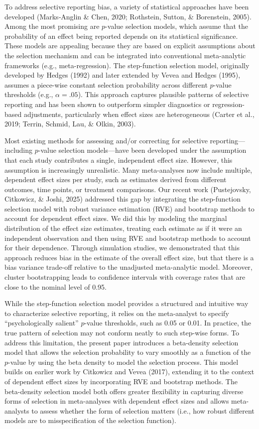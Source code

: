 \documentclass[
  man, donotrepeattitle,floatsintext]{apa7}
\begin{document}
To address selective reporting bias, a variety of statistical approaches have been developed (Marks‐Anglin \& Chen, 2020; Rothstein, Sutton, \& Borenstein, 2005). Among the most promising are \(p\)-value selection models, which assume that the probability of an effect being reported depends on its statistical significance. These models are appealing because they are based on explicit assumptions about the selection mechanism and can be integrated into conventional meta-analytic frameworks (e.g., meta-regression). The step-function selection model, originally developed by Hedges (1992) and later extended by Vevea and Hedges (1995), assumes a piece-wise constant selection probability across different \(p\)-value thresholds (e.g., \(\alpha = .05\)). This approach captures plausible patterns of selective reporting and has been shown to outperform simpler diagnostics or regression-based adjustments, particularly when effect sizes are heterogeneous (Carter et al., 2019; Terrin, Schmid, Lau, \& Olkin, 2003).

Most existing methods for assessing and/or correcting for selective reporting---including \(p\)-value selection models---have been developed under the assumption that each study contributes a single, independent effect size. However, this assumption is increasingly unrealistic. Many meta-analyses now include multiple, dependent effect sizes per study, such as estimates derived from different outcomes, time points, or treatment comparisons. Our recent work (Pustejovsky, Citkowicz, \& Joshi, 2025) addressed this gap by integrating the step-function selection model with robust variance estimation (RVE) and bootstrap methods to account for dependent effect sizes. We did this by modeling the marginal distribution of the effect size estimates, treating each estimate as if it were an independent observation and then using RVE and bootstrap methods to account for their dependence. Through simulation studies, we demonstrated that this approach reduces bias in the estimate of the overall effect size, but that there is a bias variance trade-off relative to the unadjusted meta-analytic model. Moreover, cluster bootstrapping leads to confidence intervals with coverage rates that are close to the nominal level of 0.95.

While the step-function selection model provides a structured and intuitive way to characterize selective reporting, it relies on the meta-analyst to specify ``psychologically salient'' \(p\)-value thresholds, such as 0.05 or 0.01. In practice, the true pattern of selection may not conform neatly to such step-wise forms. To address this limitation, the present paper introduces a beta-density selection model that allows the selection probability to vary smoothly as a function of the \(p\)-value by using the beta density to model the selection process. This model builds on earlier work by Citkowicz and Vevea (2017), extending it to the context of dependent effect sizes by incorporating RVE and bootstrap methods. The beta-density selection model both offers greater flexibility in capturing diverse forms of selection in meta-analyses with dependent effect sizes and allows meta-analysts to assess whether the form of selection matters (i.e., how robust different models are to misspecification of the selection function).
\end{document}
